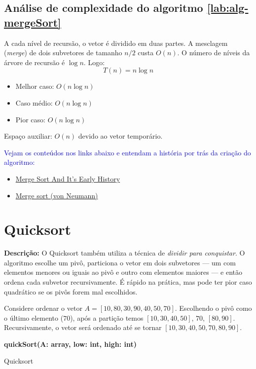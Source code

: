\subsection{Análise de complexidade do algoritmo \ref{lab:alg-mergeSort}}
A cada nível de recursão, o vetor é dividido em duas partes. A mesclagem (\textit{merge}) de dois subvetores de tamanho $n/2$ custa $O(n)$. O número de níveis da árvore de recursão é $\log n$. Logo:
\[
T(n) = n \log n
\]
\begin{itemize}
    \item Melhor caso: $O(n \log n)$
    \item Caso médio: $O(n \log n)$
    \item Pior caso: $O(n \log n)$
\end{itemize}
Espaço auxiliar: $O(n)$ devido ao vetor temporário.

\textcolor{blue}{Vejam os conteúdos nos links abaixo e entendam a história por trás da criação do algoritmo:}
\begin{itemize}
    \item 
      \href{https://compileralchemy.substack.com/p/merge-sort-and-its-early-history}{Merge Sort And It's Early History}
    \item 
      \href{https://compileralchemy.substack.com/p/merge-sort-and-its-early-history}{Merge sort (von Neumann)}
\end{itemize}


\section{Quicksort}

\textbf{Descrição:} O Quicksort também utiliza a técnica de \textit{dividir para conquistar}. O algoritmo escolhe um pivô, particiona o vetor em dois subvetores — um com elementos menores ou iguais ao pivô e outro com elementos maiores — e então ordena cada subvetor recursivamente. É rápido na prática, mas pode ter pior caso quadrático se os pivôs forem mal escolhidos.

\begin{exmp}
Considere ordenar o vetor $A = [10, 80, 30, 90, 40, 50, 70]$.  
Escolhendo o pivô como o último elemento ($70$), após a partição temos $[10, 30, 40, 50]$, $70$, $[80, 90]$.  
Recursivamente, o vetor será ordenado até se tornar $[10, 30, 40, 50, 70, 80, 90]$.
\end{exmp}

\begin{algorithm}[H]
\DontPrintSemicolon
\textbf{quickSort(A: array, low: int, high: int)}\;
\caption{Quicksort}
\label{lab:alg-quickSort}
\end{algorithm}

